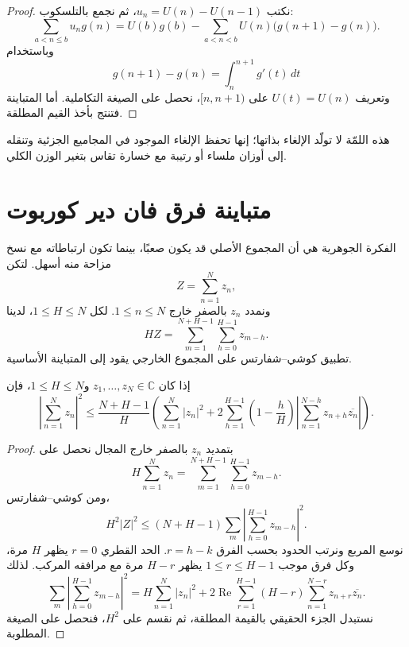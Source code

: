 \begin{proof}
نكتب \(u_n=U(n)-U(n-1)\)، ثم نجمع بالتلسكوب:
\[
\sum_{a<n\le b}u_ng(n)
=U(b)g(b)-\sum_{a<n<b}U(n)\bigl(g(n+1)-g(n)\bigr).
\]
وباستخدام
\[
g(n+1)-g(n)=\int_n^{n+1}g'(t)\,dt
\]
وتعريف \(U(t)=U(n)\) على \([n,n+1)\)، نحصل على الصيغة التكاملية. أما المتباينة فتنتج بأخذ القيم المطلقة.
\end{proof}

\begin{remark}
هذه اللمّة لا تولّد الإلغاء بذاتها؛ إنها تحفظ الإلغاء الموجود في المجاميع الجزئية وتنقله إلى أوزان ملساء أو رتيبة مع خسارة تقاس بتغير الوزن الكلي.
\end{remark}

\section{متباينة فرق فان دير كوربوت}

الفكرة الجوهرية هي أن المجموع الأصلي قد يكون صعبًا، بينما تكون ارتباطاته مع نسخ مزاحة منه أسهل. لتكن
\[
Z=\sum_{n=1}^{N}z_n,
\]
ونمدد \(z_n\) بالصفر خارج \(1\le n\le N\). لكل \(1\le H\le N\)، لدينا
\[
H Z
=
\sum_{m=1}^{N+H-1}\sum_{h=0}^{H-1}z_{m-h}.
\]
تطبيق كوشي--شفارتس على المجموع الخارجي يقود إلى المتباينة الأساسية.

\begin{lemma}
\label{lem:van-der-corput-differencing}
إذا كان \(z_1,\dots,z_N\in\mathbb C\) و\(1\le H\le N\)، فإن
\[
\left|\sum_{n=1}^{N}z_n\right|^2
\le
\frac{N+H-1}{H}
\left(
\sum_{n=1}^{N}|z_n|^2
+2\sum_{h=1}^{H-1}
\left(1-\frac{h}{H}\right)
\left|\sum_{n=1}^{N-h}z_{n+h}\overline{z_n}\right|
\right).
\]
\provedhere
\end{lemma}

\begin{proof}
بتمديد \(z_n\) بالصفر خارج المجال نحصل على
\[
H\sum_{n=1}^{N}z_n
=
\sum_{m=1}^{N+H-1}\sum_{h=0}^{H-1}z_{m-h}.
\]
ومن كوشي--شفارتس،
\[
H^2|Z|^2
\le
(N+H-1)
\sum_m\left|\sum_{h=0}^{H-1}z_{m-h}\right|^2.
\]
نوسع المربع ونرتب الحدود بحسب الفرق \(r=h-k\). الحد القطري \(r=0\) يظهر \(H\) مرة، وكل فرق موجب \(1\le r\le H-1\) يظهر \(H-r\) مرة مع مرافقه المركب. لذلك
\[
\sum_m\left|\sum_{h=0}^{H-1}z_{m-h}\right|^2
=
H\sum_{n=1}^{N}|z_n|^2
+2\operatorname{Re}\sum_{r=1}^{H-1}(H-r)
\sum_{n=1}^{N-r}z_{n+r}\overline{z_n}.
\]
نستبدل الجزء الحقيقي بالقيمة المطلقة، ثم نقسم على \(H^2\)، فنحصل على الصيغة المطلوبة.
\end{proof}

